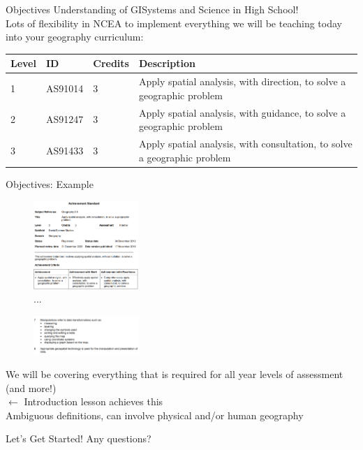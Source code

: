 \documentclass{beamer}
\begin{document}
\begin{frame}{Objectives}
    Understanding of GISystems and Science in High School! \\
    \vspace{1cm}
    Lots of flexibility in NCEA to implement everything we will be teaching today into your geography curriculum:
    \vspace{0.5cm}
    
    \centering
    \scriptsize
    \begin{tabular}{|p{1cm}|p{2cm}|p{1cm}|p{5cm}|}
        \hline
        Level & ID & Credits & Description  \\
        \hline 
        1 & AS91014 & 3 &  Apply spatial analysis, with direction, to solve a geographic problem \\
        \hline
        2 & AS91247 & 3 & Apply spatial analysis, with guidance, to solve a geographic problem \\
        \hline
        3 & AS91433 & 3 & Apply spatial analysis, with consultation, to solve a geographic problem \\
        \hline
    \end{tabular}
\end{frame}

\begin{frame}{Objectives: Example}
\begin{minipage}{.5\textwidth}
  \centering
  \begin{figure}
    \includegraphics[width=150px]{images/standard_example.PNG}\\
    
    ...
    
    \includegraphics[width=150px]{images/standard_example_2.PNG}\\
  \end{figure}
\end{minipage}%
\begin{minipage}{.5\textwidth}
  We will be covering everything that is required for all year levels of assessment (and more!)\\
  
  $\leftarrow$ Introduction lesson achieves this \\
  
  Ambiguous definitions, can involve physical and/or human geography
\end{minipage}
\end{frame}

\begin{frame}{Let's Get Started!}
    Any questions? 
\end{frame}
\end{document}
